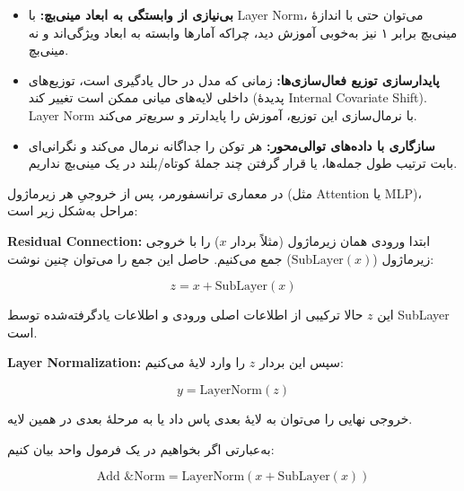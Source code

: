 \begin{itemize}
	\item \textbf{بی‌نیازی از وابستگی به ابعاد مینی‌بچ:}  
	با Layer Norm، می‌توان حتی با اندازهٔ مینی‌بچ برابر ۱ نیز به‌خوبی آموزش دید، چراکه آمارها وابسته به ابعاد ویژگی‌اند و نه مینی‌بچ.
	
	\item \textbf{پایدارسازی توزیع فعال‌سازی‌ها:}  
	زمانی که مدل در حال یادگیری است، توزیع‌های داخلی لایه‌های میانی ممکن است تغییر کند (پدیدهٔ Internal Covariate Shift). Layer Norm با نرمال‌سازی این توزیع، آموزش را پایدارتر و سریع‌تر می‌کند.
	
	\item \textbf{سازگاری با داده‌های توالی‌محور:}  
	هر توکن را جداگانه نرمال می‌کند و نگرانی‌ای بابت ترتیب طول جمله‌ها، یا قرار گرفتن چند جملهٔ کوتاه/بلند در یک مینی‌بچ نداریم.
\end{itemize}





در معماری ترانسفورمر، پس از خروجیِ هر زیرماژول (مثل Attention یا MLP)، مراحل به‌شکل زیر است:

\textbf{Residual Connection:} ابتدا ورودی همان زیرماژول (مثلاً بردار \( x \)) را با خروجی زیرماژول (\( \text{SubLayer}(x) \)) جمع می‌کنیم. حاصل این جمع را می‌توان چنین نوشت:

\[
z = x + \text{SubLayer}(x)
\]

این \( z \) حالا ترکیبی از اطلاعات اصلی ورودی و اطلاعات یادگرفته‌شده توسط SubLayer است.

\textbf{Layer Normalization:} سپس این بردار \( z \) را وارد لایهٔ  می‌کنیم:

\[
y = \text{LayerNorm}(z)
\]

خروجی نهایی را می‌توان به لایهٔ بعدی پاس داد یا به مرحلهٔ بعدی در همین لایه.

به‌عبارتی اگر بخواهیم در یک فرمول واحد بیان کنیم:

\[
\text{Add \& Norm} = \text{LayerNorm}\left(x + \text{SubLayer}(x)\right)
\]















